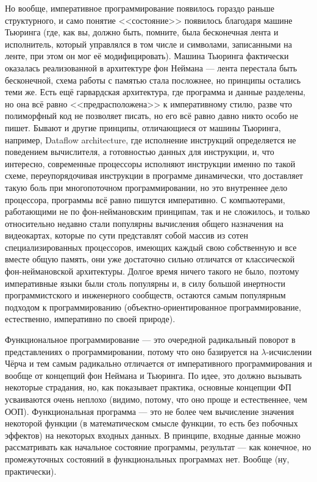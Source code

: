 \documentclass[a5paper]{article}
\begin{document}
Но вообще, императивное программирование появилось гораздо раньше структурного, и само понятие <<состояние>> появилось благодаря машине Тьюринга (где, как вы, должно быть, помните, была бесконечная лента и исполнитель, который управлялся в том числе и символами, записанными на ленте, при этом он мог её модифицировать). Машина Тьюринга фактически оказалась реализованной в архитектуре фон Неймана --- лента перестала быть бесконечной, схема работы с памятью стала посложнее, но принципы остались теми же. Есть ещё гарвардская архитектура, где программа и данные разделены, но она всё равно <<предрасположена>> к императивному стилю, разве что полиморфный код не позволяет писать, но его всё равно давно никто особо не пишет. Бывают и другие принципы, отличающиеся от машины Тьюринга, например, Dataflow architecture, где исполнение инструкций определяется не поведением вычислителя, а готовностью данных для инструкции, и, что интересно, современные процессоры исполняют инструкции именно по такой схеме, переупорядочивая инструкции в программе динамически, что доставляет такую боль при многопоточном программировании, но это внутреннее дело процессора, программы всё равно пишутся императивно. С компьютерами, работающими не по фон-неймановским принципам, так и не сложилось, и только относительно недавно стали популярны вычисления общего назначения на видеокартах, которые по сути представлят собой массив из сотен специализированных процессоров, имеющих каждый свою собственную и все вместе общую память, они уже достаточно сильно отличатся от классической фон-неймановской архитектуры. Долгое время ничего такого не было, поэтому императивные языки были столь популярны и, в силу большой инертности программистского и инженерного сообществ, остаются самым популярным подходом к программированию (объектно-ориентированное программирование, естественно, императивно по своей природе).

Функциональное программирование --- это очередной радикальный поворот в представлениях о программировании, потому что оно базируется на $\lambda$-исчислении Чёрча и тем самым радикально отличается от императивного программирования и вообще от концепций фон Неймана и Тьюринга. По идее, это должно вызывать некоторые страдания, но, как показывает практика, основные концепции ФП усваиваются очень неплохо (видимо, потому, что оно проще и естественнее, чем ООП). Функциональная программа --- это не более чем вычисление значения некоторой функции (в математическом смысле функции, то есть без побочных эффектов) на некоторых входных данных. В принципе, входные данные можно рассматривать как начальное состояние программы, результат --- как конечное, но промежуточных состояний в функциональных программах нет. Вообще (ну, практически).
\end{document}
